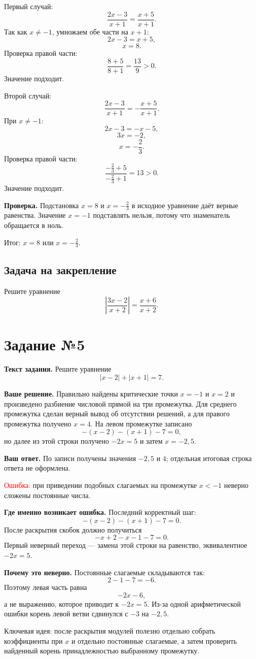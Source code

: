 \documentclass[12pt,a4paper]{article}
\newcommand{\err}{\textcolor{red}{Ошибка:}}
\newcommand{\idea}{\textcolor{blue!60!black}{Ключевая идея:}}
\newcommand{\result}{\textcolor{teal!60!black}{Итог:}}
\newcommand{\tasktitle}[1]{\phantomsection\label{task:#1}\section*{Задание №#1}}
\begin{document}
Первый случай:
\[
\frac{2x-3}{x+1}=\frac{x+5}{x+1}.
\]
Так как $x\ne-1$, умножаем обе части на $x+1$:
\[
2x-3=x+5,
\]
\[
x=8.
\]
Проверка правой части:
\[
\frac{8+5}{8+1}=\frac{13}{9}>0.
\]
Значение подходит.

Второй случай:
\[
\frac{2x-3}{x+1}=-\frac{x+5}{x+1}.
\]
При $x\ne-1$:
\[
2x-3=-x-5,
\]
\[
3x=-2,
\]
\[
x=-\frac23.
\]
Проверка правой части:
\[
\frac{-\frac23+5}{-\frac23+1}=13>0.
\]
Значение подходит.

\textbf{Проверка.} Подстановка $x=8$ и $x=-\frac23$ в исходное уравнение даёт верные равенства. Значение $x=-1$ подставлять нельзя, потому что знаменатель обращается в ноль.

\result{} $x=8$ или $x=-\frac23$.

\subsection*{Задача на закрепление}
Решите уравнение
\[
\left|\frac{3x-2}{x+2}\right|=\frac{x+6}{x+2}.
\]

\newpage
\tasktitle{5}
\textbf{Текст задания.} Решите уравнение
\[
|x-2|+|x+1|=7.
\]

\textbf{Ваше решение.} Правильно найдены критические точки $x=-1$ и $x=2$ и произведено разбиение числовой прямой на три промежутка. Для среднего промежутка сделан верный вывод об отсутствии решений, а для правого промежутка получено $x=4$. На левом промежутке записано
\[
-(x-2)-(x+1)-7=0,
\]
но далее из этой строки получено $-2x=5$ и затем $x=-2{,}5$.

\textbf{Ваш ответ.} По записи получены значения $-2{,}5$ и $4$; отдельная итоговая строка ответа не оформлена.

\err{} при приведении подобных слагаемых на промежутке $x<-1$ неверно сложены постоянные числа.

\textbf{Где именно возникает ошибка.} Последний корректный шаг:
\[
-(x-2)-(x+1)-7=0.
\]
После раскрытия скобок должно получиться
\[
-x+2-x-1-7=0.
\]
Первый неверный переход --- замена этой строки на равенство, эквивалентное $-2x=5$.

\textbf{Почему это неверно.} Постоянные слагаемые складываются так:
\[
2-1-7=-6.
\]
Поэтому левая часть равна
\[
-2x-6,
\]
а не выражению, которое приводит к $-2x=5$. Из-за одной арифметической ошибки корень левой ветви сдвинулся с $-3$ на $-2{,}5$.

\idea{} после раскрытия модулей полезно отдельно собрать коэффициенты при $x$ и отдельно постоянные слагаемые, а затем проверить найденный корень принадлежностью выбранному промежутку.
\end{document}

